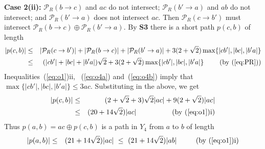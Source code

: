 \pdfoutput=1  \documentclass[11pt]{article}
\newcommand{\Pa}{{\mathcal P}}
\begin{document}
\medskip
\noindent
{\bf Case 2(ii):}
$\Pa_R(b \rightarrow c)$ and $ac$ do not intersect;
$\Pa_R(b' \rightarrow a)$ and $ab$ do not intersect;
and $\Pa_R(b' \rightarrow a)$ does not intersect $ac$.
Then $\Pa_R(c \rightarrow b')$ must intersect
$\Pa_R(b \rightarrow c) \oplus \Pa_R(b' \rightarrow a)$.
By {\bf S3} there is a short path $p(c,b)$ of length
\begin{eqnarray*}
\nonumber |p(c,b)| & \le & |\Pa_R(c \rightarrow b')| + |\Pa_R(b \rightarrow c)| + |\Pa_R(b' \rightarrow a)| +  3(2+\sqrt{2}) \max\{|cb'|, |bc|, |b'a|\} \\
                   & \le & (|cb'| + |bc| + |b'a|)\sqrt{2} + 3(2+\sqrt{2}) \max\{|cb'|, |bc|, |b'a|\} ~~~~~~~\mbox{(by~(\ref{eq:PR}))}
\label{eq:o6}
\end{eqnarray*}
Inequalities~(\ref{eq:o1})ii, ~(\ref{eq:o4a}) and~(\ref{eq:o4b}) imply that
$\max\{|cb'|, |bc|, |b'a|\} \le 3ac$. Substituting in the above,
we get
\begin{eqnarray*}
\nonumber |p(c,b)| & \le & (2+\sqrt{2}+3)\sqrt{2}|ac| +  9(2+\sqrt{2})|ac| \\
                   & \le & (20 + 14\sqrt{2}) |ac| ~~~~~~~~~~~~~~~\mbox{(by~(\ref{eq:o1})i)}
\label{eq:o7}
\end{eqnarray*}
Thus $p(a,b) = ac \oplus p(c,b)$ is a path in $Y_4$ from $a$ to $b$ of length
\begin{eqnarray*}
\nonumber |p(a,b)| & \le & (21 + 14\sqrt{2}) |ac|  ~\le ~(21 + 14\sqrt{2}) |ab|~~~~~~~~\mbox{(by~(\ref{eq:o1})i)} \\
\label{eq:o8}
\end{eqnarray*}
\end{document}
